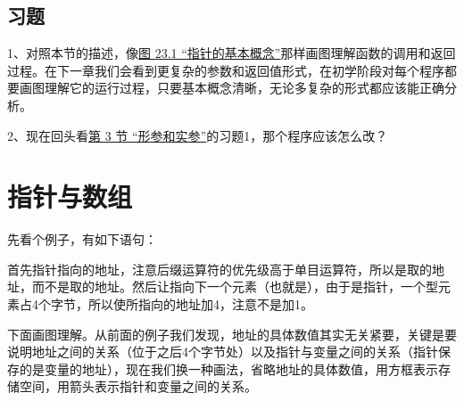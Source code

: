 \subsection*{习题}
%


1、对照本节的描述，像\hyperlink{db.ch23s01.id2810538}{图 23.\BookSplit{}1 “指针的基本概念”}那样画图理解函数的调用和返回过程。在下一章我们会看到更复杂的参数和返回值形式，在初学阶段对每个程序都要画图理解它的运行过程，只要基本概念清晰，无论多复杂的形式都应该能正确分析。



2、现在回头看\hyperlink{db.ch03s03.id2713785}{第 3 节 “形参和实参”}的习题1，那个程序应该怎么改？




\section{指针与数组}
%
先看个例子，有如下语句：




首先指针指向的地址，注意后缀运算符的优先级高于单目运算符，所以是取的地址，而不是取的地址。然后让指向下一个元素（也就是），由于是指针，一个型元素占4个字节，所以使所指向的地址加4，注意不是加1。



下面画图理解。从前面的例子我们发现，地址的具体数值其实无关紧要，关键是要说明地址之间的关系（位于之后4个字节处）以及指针与变量之间的关系（指针保存的是变量的地址），现在我们换一种画法，省略地址的具体数值，用方框表示存储空间，用箭头表示指针和变量之间的关系。




